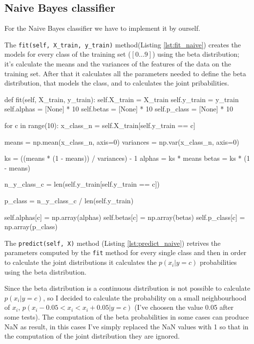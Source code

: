 \documentclass[12pt]{article}
\begin{document}
\subsection{Naive Bayes classifier}

For the Naive Bayes classifier we have to implement it by ourself.

The \verb|fit(self, X_train, y_train)| method(Listing \ref{lst:fit_naive}) creates 
the models for every class of the
training set ($[0 \dots 9]$) using the beta distribution; it's calculate the means
and the variances of the features of the data on the training set. After that it
calculates all the parameters needed to define the beta distribution, that models the 
class, and to calculates the joint pribabilities.

\begin{python}[caption={Naive Bayes fit method},label={lst:fit_naive}]
def fit(self, X_train, y_train):
    self.X_train = X_train
    self.y_train = y_train
    self.alphas = [None] * 10
    self.betas = [None] * 10
    self.p_class = [None] * 10

    for c in range(10):
        x_class_n = self.X_train[self.y_train == c]

        means = np.mean(x_class_n, axis=0)
        variances = np.var(x_class_n, axis=0)            
        
        ks = ((means * (1 - means)) / variances) - 1
        alphas = ks * means
        betas = ks * (1 - means)

        n_y_class_c = len(self.y_train[self.y_train == c])

        p_class = n_y_class_c / len(self.y_train)

        self.alphas[c] = np.array(alphas)
        self.betas[c] = np.array(betas)
        self.p_class[c] = np.array(p_class)
\end{python}

The \verb|predict(self, X)| method (Listing \ref{lst:predict_naive}) retrives
the parameters computed by the \verb|fit| method for every single class and then in 
order to calculate the joint distributions it calculates the $p(x_i|y=c)$ 
probabilities using the beta distribution. 

Since the beta distribution is a continuous
distribution is not possible to calculate $p(x_i|y=c)$, so I decided to calculate
the probability on a small neighbourhood of $x_i$, $p( x_i-0.05<x_i<x_i+0.05 | y=c)$ 
(I've choosen the value 0.05 after some tests). 
The computation of the beta probabilities in some cases can produce NaN as result, 
in this cases I've simply replaced the NaN values with 1 so that in the computation
of the joint distribution they are ignored.
\end{document}
